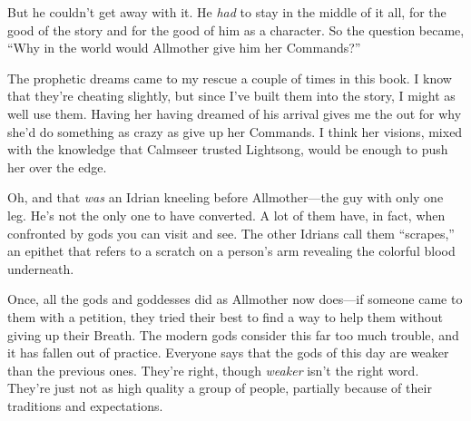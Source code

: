 But he couldn’t get away with it. He \textit{had} to stay in the middle of it all, for the good of the story and for the good of him as a character. So the question became, “Why in the world would Allmother give him her Commands?”

The prophetic dreams came to my rescue a couple of times in this book. I know that they’re cheating slightly, but since I’ve built them into the story, I might as well use them. Having her having dreamed of his arrival gives me the out for why she’d do something as crazy as give up her Commands. I think her visions, mixed with the knowledge that Calmseer trusted Lightsong, would be enough to push her over the edge.

Oh, and that \textit{was} an Idrian kneeling before Allmother—the guy with only one leg. He’s not the only one to have converted. A lot of them have, in fact, when confronted by gods you can visit and see. The other Idrians call them “scrapes,” an epithet that refers to a scratch on a person’s arm revealing the colorful blood underneath.

Once, all the gods and goddesses did as Allmother now does—if someone came to them with a petition, they tried their best to find a way to help them without giving up their Breath. The modern gods consider this far too much trouble, and it has fallen out of practice. Everyone says that the gods of this day are weaker than the previous ones. They’re right, though \textit{weaker} isn’t the right word. They’re just not as high quality a group of people, partially because of their traditions and expectations.



